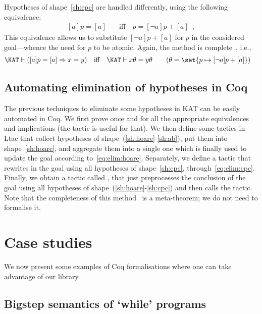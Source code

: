\documentclass[a4paper]{llncs}
\begin{document}
\medskip

\noindent
Hypotheses of shape~\eqref{sh:cpc} are handled differently, using the following
equivalence:
\begin{align}
  \label{eq:elim:cpc}
  \tag{$\ddag$}
  [a]p = [a] &\quad\text{iff}\quad p = [\neg a]p+[a]\enspace,
\end{align}
This equivalence allows us to substitute $[\neg a]p+[a]$ for $p$ in
the considered goal---whence the need for $p$ to be atomic. Again, the
method is complete~\cite{hardink02:kat:hypotheses}, i.e.,
\begin{align*}
  \KAT\vdash ([a]p = [a] \Rightarrow x=y) &\quad\text{iff}\quad
  \KAT\vdash x\theta=y\theta \tag{$\theta=\set{p\mapsto[\neg a]p+[a]}$}
\end{align*}

\subsection{Automating elimination of hypotheses in Coq}
\label{ssec:hkat}

The previous techniques to eliminate some hypotheses in KAT can be
easily automated in Coq. We first prove once and for all the
appropriate equivalences and implications (the tactic  is
useful for that). We then define some tactics in Ltac that collect
hypotheses of shape~(\ref{sh:hoare}-\ref{sh:ab}), put them into
shape~\eqref{sh:hoare}, and aggregate them into a single one which is
finally used to update the goal according
to~\eqref{eq:elim:hoare}. Separately, we define a tactic that rewrites
in the goal using all hypotheses of shape~\eqref{sh:cpc},
through~\eqref{eq:elim:cpc}. Finally, we obtain a tactic called
, that just preprocesses the conclusion of the goal using
all hypotheses of shape~(\ref{sh:hoare}-\ref{sh:cpc}) and then calls
the  tactic.
Note that the completeness of this
method~\cite{hardink02:kat:hypotheses} is a meta-theorem; we do not
need to formalise it.

\section{Case studies}
\label{sec:apps}

We now present some examples of Coq formalisations where one can take
advantage of our library.

\subsection{Bigstep semantics of `while' programs}
\label{ssec:imp}
\end{document}
